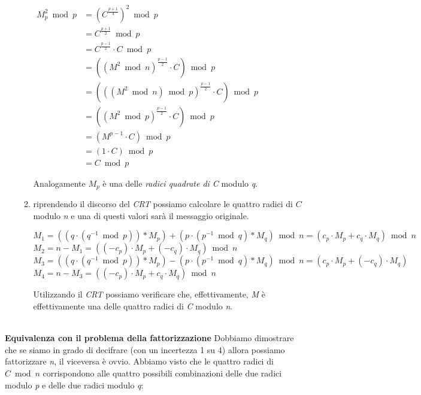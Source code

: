 \begin{itemize}
\begin{enumerate}
\begin{center}
\begin{math}
                \begin{aligned}
                    M_p^2 \bmod p &= (C^{\frac{p + 1}{4}})^2 \bmod p \\
                    &= C^{\frac{p + 1}{2}} \bmod p \\
                    &= C^{\frac{p - 1}{2}} \cdot C \bmod p \\
                    &= ((M^2 \bmod n)^{\frac{p - 1}{2}} \cdot C) \bmod p \\
                    &= (((M^2 \bmod n) \bmod p)^{\frac{p - 1}{2}} \cdot C) \bmod p \\
                    &= ((M^2 \bmod p)^{\frac{p - 1}{2}} \cdot C) \bmod p \\
                    &= (M^{p - 1} \cdot C) \bmod p \\
                    &= (1 \cdot C) \bmod p \\
                    &= C \bmod p
                \end{aligned}
            \end{math}
        \end{center}
        Analogamente $M_p$ è una delle \textit{radici quadrate di C} modulo \textit{q}.
        \item riprendendo il discorso del \textit{CRT} possiamo calcolare le quattro radici di $C$ modulo \textit{n} e una di questi valori sarà il messaggio originale.
        \begin{center}
            $M_1 = ((q \cdot (q^{-1} \bmod p)) * M_p) + (p \cdot (p^{-1} \bmod q) * M_q) \bmod n = (c_p \cdot M_p + c_q \cdot M_q) \bmod n$ \\
            $M_2 = n - M_1 = ((-c_p) \cdot M_p + (-c_q) \cdot M_q) \bmod n$ \\
            $M_3 = ((q \cdot (q^{-1} \bmod p)) * M_p) - (p \cdot (p^{-1} \bmod q) * M_q) \bmod n = (c_p \cdot M_p + (-c_q) \cdot M_q)$ \\
            $M_4 = n - M_3 = ((-c_p) \cdot M_p + c_q \cdot M_q) \bmod n$ 
        \end{center}
        Utilizzando il \textit{CRT} possiamo verificare che, effettivamente, \textit{M} è effettivamente una delle quattro radici di \textit{C} modulo \textit{n}.
    \end{enumerate}
\end{itemize}
\   \\
\textbf{Equivalenza con il problema della fattorizzazione}
\newline
Dobbiamo dimostrare che se siamo in grado di decifrare (con un incertezza 1 su 4) allora possiamo fattorizzare \textit{n}, il viceversa è ovvio. Abbiamo visto che le quattro radici di $C \bmod n$ corrispondono alle quattro possibili combinazioni delle due radici modulo \textit{p} e delle due radici modulo \textit{q}:
